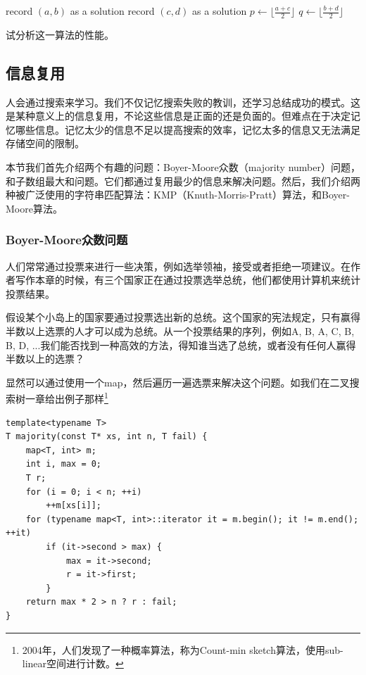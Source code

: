 \documentclass[UTF8]{article}
\begin{document}
\begin{Exercise}
\begin{itemize}
\begin{algorithmic}[1]
      \State record $(a, b)$ as a solution
    \EndIf
      \State record $(c, d)$ as a solution
    \EndIf
    \State \Return
  \EndIf
  \State $p \gets \lfloor \frac{a + c}{2} \rfloor$
  \State $q \gets \lfloor \frac{b + d}{2} \rfloor$
  \State {}
  \State {}
  \State {}
  \State {}
\EndProcedure
\end{algorithmic}
试分析这一算法的性能。
\end{itemize}
\end{Exercise}

\subsection{信息复用}

人会通过搜索来学习。我们不仅记忆搜索失败的教训，还学习总结成功的模式。这是某种意义上的信息复用，不论这些信息是正面的还是负面的。但难点在于决定记忆哪些信息。记忆太少的信息不足以提高搜索的效率，记忆太多的信息又无法满足存储空间的限制。

本节我们首先介绍两个有趣的问题：Boyer-Moore众数（majority number）问题，和子数组最大和问题。它们都通过复用最少的信息来解决问题。然后，我们介绍两种被广泛使用的字符串匹配算法：KMP（Knuth-Morris-Pratt）算法，和Boyer-Moore算法。

\subsubsection{Boyer-Moore众数问题}

人们常常通过投票来进行一些决策，例如选举领袖，接受或者拒绝一项建议。在作者写作本章的时候，有三个国家正在通过投票选举总统，他们都使用计算机来统计投票结果。

假设某个小岛上的国家要通过投票选出新的总统。这个国家的宪法规定，只有赢得半数以上选票的人才可以成为总统。从一个投票结果的序列，例如A, B, A, C, B, B, D, ...我们能否找到一种高效的方法，得知谁当选了总统，或者没有任何人赢得半数以上的选票？

显然可以通过使用一个map，然后遍历一遍选票来解决这个问题。如我们在二叉搜索树一章给出例子那样\footnote{2004年，人们发现了一种概率算法，称为Count-min sketch算法，使用sub-linear空间进行计数\cite{count-min-sketch}。}

\lstset{language=C++}
\begin{lstlisting}
template<typename T>
T majority(const T* xs, int n, T fail) {
    map<T, int> m;
    int i, max = 0;
    T r;
    for (i = 0; i < n; ++i)
        ++m[xs[i]];
    for (typename map<T, int>::iterator it = m.begin(); it != m.end(); ++it)
        if (it->second > max) {
            max = it->second;
            r = it->first;
        }
    return max * 2 > n ? r : fail;
}
\end{lstlisting}
\end{document}
